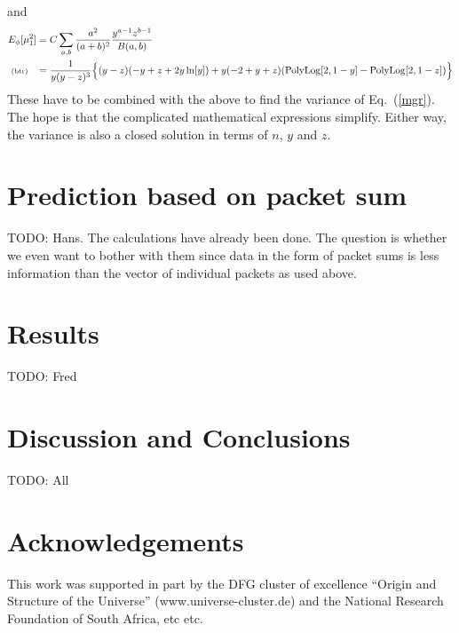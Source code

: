 \documentclass[11pt]{article}
\newcommand{\lleq}[1]{\label{#1} }
\renewcommand{\lleq}[1]{\label{#1} {\scriptstyle {\rm (#1)}} \hspace*{2ex} }
\begin{document}
and
\begin{align}
  E_\phi[\mu_1^2] &= C\sum_{a,b} \frac{a^2}{(a+b)^2}
  \frac{y^{a-1}z^{b-1}}{B(a,b)}
  \nonumber\\
  \lleq{btr} %
  &= \frac{1}{y (y - z)^3}
  \Bigl\{
  (y - z) (-y + z + 2 y \ln[y]) + y (-2 + y + z)
  (\mathrm{PolyLog}[2, 1 - y] - \mathrm{PolyLog}[2, 1 - z])
  \Bigr\}
\end{align}
These have to be combined with the above to find the variance of
Eq.~(\ref{mgr}). The hope is that the complicated mathematical
expressions simplify. Either way, the variance is also a closed
solution in terms of $n$, $y$ and $z$.

\section{Prediction based on packet sum}

TODO: Hans. The calculations have already been done. The question is
whether we even want to bother with them since data in the form of
packet sums is less information than the vector of individual packets
as used above.

\section{Results}

TODO: Fred

\section{Discussion and Conclusions}

TODO: All

\section*{Acknowledgements}

This work was supported in part by the DFG cluster of excellence
``Origin and Structure of the Universe'' (www.universe-cluster.de) and
the National Research Foundation of South Africa, etc etc.

\end{document}
